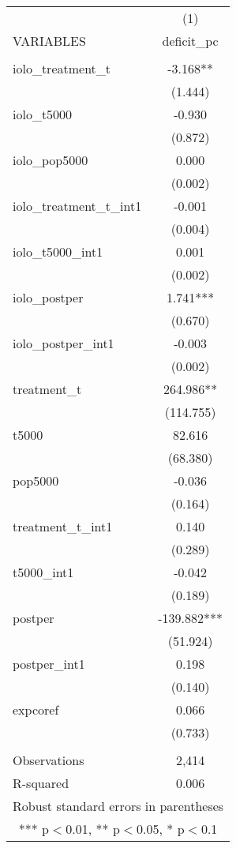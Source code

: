 \documentclass[]{article}
\begin{document}
\begin{tabular}{lc} \hline
 & (1) \\
VARIABLES & deficit\_pc \\ \hline
 &  \\
iolo\_treatment\_t & -3.168** \\
 & (1.444) \\
iolo\_t5000 & -0.930 \\
 & (0.872) \\
iolo\_pop5000 & 0.000 \\
 & (0.002) \\
iolo\_treatment\_t\_int1 & -0.001 \\
 & (0.004) \\
iolo\_t5000\_int1 & 0.001 \\
 & (0.002) \\
iolo\_postper & 1.741*** \\
 & (0.670) \\
iolo\_postper\_int1 & -0.003 \\
 & (0.002) \\
treatment\_t & 264.986** \\
 & (114.755) \\
t5000 & 82.616 \\
 & (68.380) \\
pop5000 & -0.036 \\
 & (0.164) \\
treatment\_t\_int1 & 0.140 \\
 & (0.289) \\
t5000\_int1 & -0.042 \\
 & (0.189) \\
postper & -139.882*** \\
 & (51.924) \\
postper\_int1 & 0.198 \\
 & (0.140) \\
expcoref & 0.066 \\
 & (0.733) \\
 &  \\
Observations & 2,414 \\
 R-squared & 0.006 \\ \hline
\multicolumn{2}{c}{ Robust standard errors in parentheses} \\
\multicolumn{2}{c}{ *** p$<$0.01, ** p$<$0.05, * p$<$0.1} \\
\end{tabular}
\end{document}
